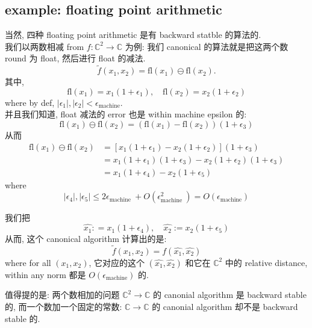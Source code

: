 \documentclass[lang=cn,11pt]{elegantbook}
\begin{document}
\subsection{example: floating point arithmetic}
\begin{example}
    当然, 四种 floating point arithmetic 是有 backward statble 的算法的.\\
我们以两数相减 from $f:\mathbb{C}^2 \to \mathbb{C}$ 为例: 我们 canonical 的算法就是把这两个数 round 为 float, 然后进行 float 的减法.
$$
\tilde{f}\left(x_1, x_2\right)=\mathrm{fl}\left(x_1\right) \ominus \mathrm{fl}\left(x_2\right) .
$$
其中, 
$$
\mathrm{fl}\left(x_1\right)=x_1\left(1+\epsilon_1\right), \quad \mathrm{fl}\left(x_2\right)=x_2\left(1+\epsilon_2\right)
$$
where by def, $|\epsilon_1|,|\epsilon_2| < \epsilon_{\text{machine}}$.\\
并且我们知道, float 减法的 error 也是 within machine epsilon 的: $$
\mathrm{fl}\left(x_1\right) \ominus \mathrm{fl}\left(x_2\right)=\left(\mathrm{fl}\left(x_1\right)-\mathrm{fl}\left(x_2\right)\right)\left(1+\epsilon_3\right)
$$
从而$$
\begin{aligned}
\mathrm{fl}\left(x_1\right) \ominus \mathrm{fl}\left(x_2\right) & =\left[x_1\left(1+\epsilon_1\right)-x_2\left(1+\epsilon_2\right)\right]\left(1+\epsilon_3\right) \\
& =x_1\left(1+\epsilon_1\right)\left(1+\epsilon_3\right)-x_2\left(1+\epsilon_2\right)\left(1+\epsilon_3\right) \\
& =x_1\left(1+\epsilon_4\right)-x_2\left(1+\epsilon_5\right)
\end{aligned}
$$
where $$
\left|\epsilon_4\right|,\left|\epsilon_5\right| \leq 2 \epsilon_{\text {machine }}+O\left(\epsilon_{\text {machine }}^2\right) = O(\epsilon_\text {machine})
$$

我们把 \[
\hat{x_1}: = x_1\left(1+\epsilon_4\right), \quad \hat{x_2} :=x_2\left(1+\epsilon_5\right)
\]
从而, 这个 canonical algorithm 计算出的是: \[
\tilde{f} (x_1, x_2) = f (\hat{x_1},\hat{x_2})
\]where for all  $(x_1, x_2) $, 它对应的这个 $ (\hat{x_1},\hat{x_2})$ 和它在 $\mathbb{C}^2$ 中的 relative distance, within any norm 都是 $O(\epsilon_\text {machine})$ 的.
\end{example}
\begin{remark}
值得提的是: 两个数相加的问题 $\mathbb{C}^2 \to \mathbb{C}$ 的 canonial algorithm 是 backward stable 的, 而一个数加一个固定的常数: $\mathbb{C}\to \mathbb{C}$ 的 canonial algorithm 却不是 backward stable 的.
\end{remark}
\end{document}
